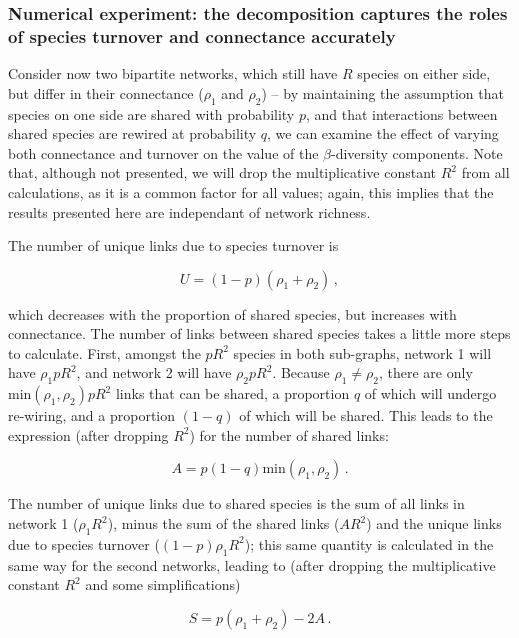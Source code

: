 \documentclass[11pt]{article}
\begin{document}
\hypertarget{numerical-experiment-the-decomposition-captures-the-roles-of-species-turnover-and-connectance-accurately}{%
\subsubsection{Numerical experiment: the decomposition captures the
roles of species turnover and connectance
accurately}\label{numerical-experiment-the-decomposition-captures-the-roles-of-species-turnover-and-connectance-accurately}}

Consider now two bipartite networks, which still have \(R\) species on
either side, but differ in their connectance (\(\rho_1\) and \(\rho_2\))
-- by maintaining the assumption that species on one side are shared
with probability \(p\), and that interactions between shared species are
rewired at probability \(q\), we can examine the effect of varying both
connectance and turnover on the value of the \(\beta\)-diversity
components. Note that, although not presented, we will drop the
multiplicative constant \(R^2\) from all calculations, as it is a common
factor for all values; again, this implies that the results presented
here are independant of network richness.

The number of unique links due to species turnover is

\[U = (1-p)(\rho_1 + \rho_2)\,,\]

which decreases with the proportion of shared species, but increases
with connectance. The number of links between shared species takes a
little more steps to calculate. First, amongst the \(pR^2\) species in
both sub-graphs, network 1 will have \(\rho_1 pR^2\), and network 2 will
have \(\rho_2 pR^2\). Because \(\rho_1 \neq \rho_2\), there are only
\(\text{min}(\rho_1, \rho_2)pR^2\) links that can be shared, a
proportion \(q\) of which will undergo re-wiring, and a proportion
\((1-q)\) of which will be shared. This leads to the expression (after
dropping \(R^2\)) for the number of shared links:

\[A = p (1-q) \text{min}(\rho_1, \rho_2)\,.\]

The number of unique links due to shared species is the sum of all links
in network 1 (\(\rho_1 R^2\)), minus the sum of the shared links
(\(AR^2\)) and the unique links due to species turnover
(\((1-p)\rho_1R^2\)); this same quantity is calculated in the same way
for the second networks, leading to (after dropping the multiplicative
constant \(R^2\) and some simplifications)

\[S = p (\rho_1 + \rho_2) - 2A\,.\]
\end{document}
